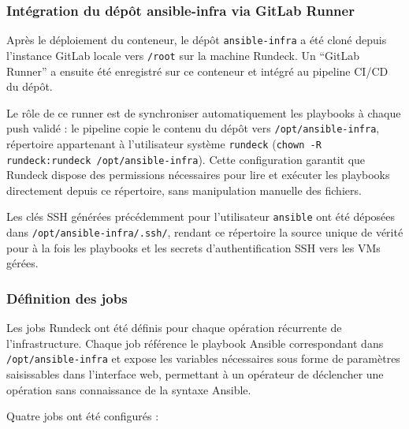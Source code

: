 \subsubsection{Intégration du dépôt ansible-infra via GitLab Runner}

\par Après le déploiement du conteneur, le dépôt \texttt{ansible-infra} a été cloné depuis l'instance GitLab locale vers \texttt{/root} sur la machine Rundeck. Un ``GitLab Runner'' a ensuite été enregistré sur ce conteneur et intégré au pipeline CI/CD du dépôt. \\

\par Le rôle de ce runner est de synchroniser automatiquement les playbooks à chaque push validé : le pipeline copie le contenu du dépôt vers \texttt{/opt/ansible-infra}, répertoire appartenant à l'utilisateur système \texttt{rundeck} (\texttt{chown -R rundeck:rundeck /opt/ansible-infra}). Cette configuration garantit que Rundeck dispose des permissions nécessaires pour lire et exécuter les playbooks directement depuis ce répertoire, sans manipulation manuelle des fichiers. \\

\par Les clés SSH générées précédemment pour l'utilisateur \texttt{ansible} ont été déposées dans \texttt{/opt/ansible-infra/.ssh/}, rendant ce répertoire la source unique de vérité pour à la fois les playbooks et les secrets d'authentification SSH vers les VMs gérées. \\

\subsubsection{Définition des jobs}

\par Les jobs Rundeck ont été définis pour chaque opération récurrente de l'infrastructure. Chaque job référence le playbook Ansible correspondant dans \texttt{/opt/ansible-infra} et expose les variables nécessaires sous forme de paramètres saisissables dans l'interface web, permettant à un opérateur de déclencher une opération sans connaissance de la syntaxe Ansible.

\par Quatre jobs ont été configurés :

